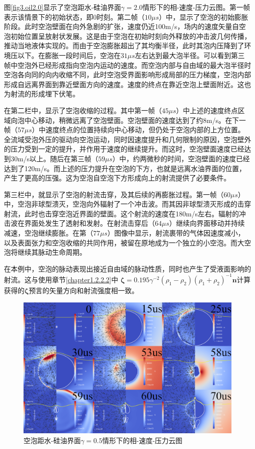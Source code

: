图\ref{fig3.oil2.0}显示了空泡距水-硅油界面$\gamma = 2.0$情形下的相-速度-压力云图。第一帧表示该情景下的初始状态，即0时刻。第二帧（$10\mu s$）中，显示了空泡的初始膨胀阶段。此时空泡壁面在向外急剧的扩张，速度仍近100m/s，场内的速度矢量自空泡初始位置呈放射状发展。这是由于空泡在初始时刻向外释放的冲击波几何传播，推动当地液体实现的。而由于空泡膨胀超出了其均衡半径，此时其泡内压降到了环境压以下。在膨胀一段时间后，空泡在$31\mu s$左右达到最大泡半径。可以看到第三帧中空泡外已经形成指向空泡内运动的速度。而空泡内部与自由域的最大泡半径时空泡各向同的向内收缩不同，此时空泡受界面影响形成局部的压力梯度，空泡内部形成自远离界面到靠近壁面方向的速度。速度的终点在靠近空泡上壁面附近。这也为射流的形成埋下伏笔。

在第二栏中，显示了空泡收缩的过程。其中第一帧（$45\mu s$）中上述的速度终点区域向泡中心移动，稍微远离了空泡壁面。空泡壁面的速度达到了约8m/s。在下一帧（$57\mu s$）中速度终点的位置持续向中心移动，但仍处于空泡内部的上方位置。全流域受泡外压的驱动向空泡运动，同时因速度提升和几何限制的原因，空泡壁外的压力受到一定的提升，并作用于速度的继续提升。而这时，空泡壁面速度已经达到30m/s以上。随后在第三帧（$59\mu s$）中，约两微秒的时间，空泡壁面的速度已经达到了120m/s。而上述的压力提升在空泡的下方，也就是远离水油界面的位置，产生了更高的压强。这为空泡自空泡下方形成向上的射流提供了必要条件。

第三栏中，就显示了空泡的射流击穿，及其后续的再膨胀过程。第一帧（$60\mu s$）中，空泡非球型溃灭，空泡向外辐射了一个冲击波。而其因非球型溃灭形成的击穿射流，此时也击穿空泡近界面的壁面。这个射流的速度在180m/s左右。辐射的冲击波在界面处发生了透射和发射。在射流击穿后（$64\mu s$）继续向界面移动并持续减速，空泡继续膨胀。在第（$77\mu s$）图像中显示，射流裹带的气体因速度减小，以及表面张力和空泡收缩的共同作用，被留在原地成为一个独立的小空泡。而大空泡将继续其脉动生命周期。

在本例中，空泡的脉动表现出接近自由域的脉动性质，同时也产生了受液面影响的射流。这与使用章节\ref{chapter1.2.2.2}中
$\bm\zeta=0.195 \gamma^{-2}\left(\rho_{1}-\rho_{2}\right)\left(\rho_{1}+\rho_{2}\right)^{-1} \boldsymbol{n}$计算获得的$\bm\zeta$预言的矢量方向和射流强度相一致。




\begin{figure}[h]
    \centering
    \includegraphics[width=0.9\linewidth]{img/fig3.oil.0.5.png}
    \caption{空泡距水-硅油界面$\gamma = 0.5$情形下的相-速度-压力云图}
    \label{fig3.oil0.5}
\end{figure}

